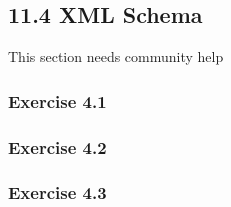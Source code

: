 \documentclass[../../main.tex]{subfiles}
\begin{document}
\subsection{11.4 XML Schema}

This section needs community help

\subsubsection*{Exercise 4.1}

\subsubsection*{Exercise 4.2}

\subsubsection*{Exercise 4.3}
\end{document}
